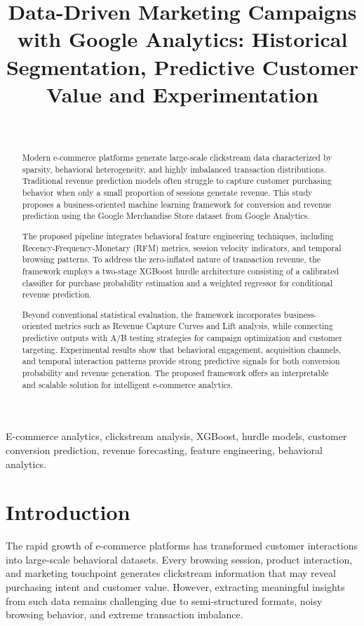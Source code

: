 \documentclass[conference]{IEEEtran}
\title{
Data-Driven Marketing Campaigns with Google Analytics: Historical Segmentation, Predictive Customer Value and Experimentation
}
\author{
\IEEEauthorblockN{
\begin{tabular}{ll}
Group 2: & Nguyen Thi Van Anh, Vu Bui Dinh Tung, \\
         & Dao Khanh Linh, Nguyen Hong Nhung, Thieu Dieu Thuy
\end{tabular}
}
\\
\IEEEauthorblockA{
DSEB 65B -- MFE, NEU \\
Course: DDM -- Data-Driven Marketing
}
}
\begin{document}
\raggedbottom
\maketitle

\begin{abstract}
Modern e-commerce platforms generate large-scale clickstream
data characterized by sparsity, behavioral heterogeneity,
and highly imbalanced transaction distributions. Traditional
revenue prediction models often struggle to capture customer
purchasing behavior when only a small proportion of sessions
generate revenue. This study proposes a business-oriented
machine learning framework for conversion and revenue
prediction using the Google Merchandise Store dataset from
Google Analytics.

The proposed pipeline integrates behavioral feature
engineering techniques, including Recency-Frequency-Monetary
(RFM) metrics, session velocity indicators, and temporal
browsing patterns. To address the zero-inflated nature of
transaction revenue, the framework employs a two-stage
XGBoost hurdle architecture consisting of a calibrated
classifier for purchase probability estimation and a
weighted regressor for conditional revenue prediction.

Beyond conventional statistical evaluation, the framework
incorporates business-oriented metrics such as Revenue
Capture Curves and Lift analysis, while connecting
predictive outputs with A/B testing strategies for campaign
optimization and customer targeting. Experimental results
show that behavioral engagement, acquisition channels, and
temporal interaction patterns provide strong predictive
signals for both conversion probability and revenue
generation. The proposed framework offers an interpretable
and scalable solution for intelligent e-commerce analytics.
\end{abstract}

\begin{IEEEkeywords}
E-commerce analytics, clickstream analysis, XGBoost, hurdle models, customer conversion prediction, revenue forecasting, feature engineering, behavioral analytics.
\end{IEEEkeywords}

\section{Introduction}
The rapid growth of e-commerce platforms has transformed
customer interactions into large-scale behavioral datasets.
Every browsing session, product interaction, and marketing
touchpoint generates clickstream information that may reveal
purchasing intent and customer value. However, extracting
meaningful insights from such data remains challenging due
to semi-structured formats, noisy browsing behavior, and
extreme transaction imbalance.
\end{document}
